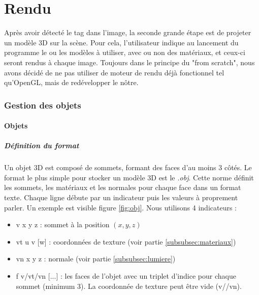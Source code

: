 \part{Rendu}
    Après avoir détecté le tag dans l'image, la seconde grande étape est de projeter un modèle 3D sur la scène. Pour cela, l'utilisateur indique au lancement du programme le ou les modèles à utiliser, avec ou non des matériaux, et ceux-ci seront rendus à chaque image. Toujours dans le principe du "from scratch", nous avons décidé de ne pas utiliser de moteur de rendu déjà fonctionnel tel qu'OpenGL, mais de redévelopper le nôtre.

    \section{Gestion des objets}

        \subsection{Objets}

            \subsubsection{Définition du format}                
                Un objet 3D est composé de sommets, formant des faces d'au moins 3 côtés. Le format le plus simple pour stocker un modèle 3D est le \emph{.obj}. Cette norme définit les sommets, les matériaux et les normales pour chaque face dans un format texte. Chaque ligne débute par un indicateur puis les valeurs à proprement parler. Un exemple est visible figure \ref{fig:obj}. Nous utilisons 4 indicateurs :
                \begin{itemize}
                    \item v x y z : sommet à la position $(x, y, z)$
                    \item vt u v [w] : coordonnées de texture (voir partie \ref{subsubsec:materiaux})
                    \item vn x y z : normale (voir partie \ref{subsubsec:lumiere})
                    \item f v/vt/vn [...] : les faces de l'objet avec un triplet d'indice pour chaque sommet (minimum 3). La coordonnée de texture peut être vide (v//vn).
                \end{itemize}
                

